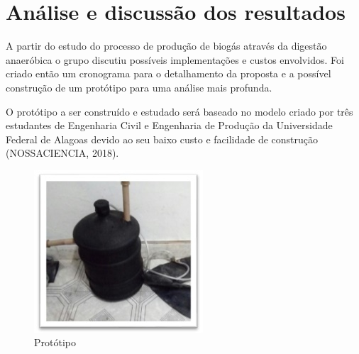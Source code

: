 \chapter{Análise e discussão dos resultados}

A partir do estudo do processo de produção de biogás através da digestão anaeróbica o grupo discutiu possíveis implementações e custos envolvidos. Foi criado então um cronograma para o detalhamento da proposta e a possível construção de um protótipo para uma análise mais profunda. 

O protótipo a ser construído e estudado será baseado no modelo criado por três estudantes de Engenharia Civil e Engenharia de Produção da Universidade Federal de Alagoas devido ao seu baixo custo e facilidade de construção (NOSSACIENCIA, 2018).
\vspace{0.2cm}

\begin{figure}[htb]
	\begin{center}
	    \includegraphics[scale=1.0]{prototipo.jpg}
	\end{center}
	\vspace*{-0.5cm}
	\caption{\label{fig_grafico}Protótipo}
\end{figure}